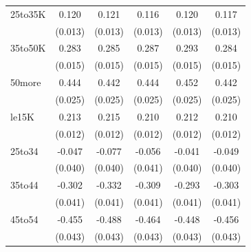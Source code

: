 \documentclass[11pt,a4paper,oldfontcommands]{memoir}
\begin{document}
{\begin{footnotesize}
\begin{tiny}
\begin{longtable}{l*{5}{c}}
25to35K             &       0.120\sym{***}&       0.121\sym{***}&       0.116\sym{***}&       0.120\sym{***}&       0.117\sym{***}\\
                    &     (0.013)         &     (0.013)         &     (0.013)         &     (0.013)         &     (0.013)         \\
 
35to50K             &       0.283\sym{***}&       0.285\sym{***}&       0.287\sym{***}&       0.293\sym{***}&       0.284\sym{***}\\
                    &     (0.015)         &     (0.015)         &     (0.015)         &     (0.015)         &     (0.015)         \\
 
50more              &       0.444\sym{***}&       0.442\sym{***}&       0.444\sym{***}&       0.452\sym{***}&       0.442\sym{***}\\
                    &     (0.025)         &     (0.025)         &     (0.025)         &     (0.025)         &     (0.025)         \\
 
le15K               &       0.213\sym{***}&       0.215\sym{***}&       0.210\sym{***}&       0.212\sym{***}&       0.210\sym{***}\\
                    &     (0.012)         &     (0.012)         &     (0.012)         &     (0.012)         &     (0.012)         \\

25to34              &      -0.047         &      -0.077         &      -0.056         &      -0.041         &      -0.049         \\
                    &     (0.040)         &     (0.040)         &     (0.041)         &     (0.040)         &     (0.040)         \\
 
35to44              &      -0.302\sym{***}&      -0.332\sym{***}&      -0.309\sym{***}&      -0.293\sym{***}&      -0.303\sym{***}\\
                    &     (0.041)         &     (0.041)         &     (0.041)         &     (0.041)         &     (0.041)         \\
 
45to54              &      -0.455\sym{***}&      -0.488\sym{***}&      -0.464\sym{***}&      -0.448\sym{***}&      -0.456\sym{***}\\
                    &     (0.043)         &     (0.043)         &     (0.043)         &     (0.043)         &     (0.043)         \\
 

\end{longtable}
\end{tiny}
\end{footnotesize}}
\end{document}
